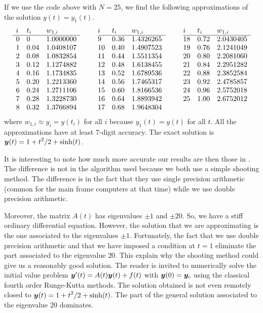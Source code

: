 \begin{egg}
If we use the code above with $N=25$, we find the following approximations of
the solution $y(t) = y_1(t)$.
\[
\begin{array}{lllc@{\hspace{2em}}lllc@{\hspace{2em}}lll}
i & t_i & w_{1,i} & & i & t_i & w_{1,i} & & i & t_i & w_{1,i} \\ 
\cline{1-3} \cline{5-7} \cline{9-11}
0 & 0 & 1.0000000 & & 9 & 0.36 & 1.4326265 & & 18 & 0.72 & 2.0430405 \\
1 & 0.04 & 1.0408107 & & 10 & 0.40 & 1.4907523 & & 19 & 0.76 & 2.1241049 \\
2 & 0.08 & 1.0832854 & & 11 & 0.44 & 1.5511354 & & 20 & 0.80 & 2.2081060 \\
3 & 0.12 & 1.1274882 & & 12 & 0.48 & 1.6138455 & & 21 & 0.84 & 2.2951282 \\
4 & 0.16 & 1.1734835 & & 13 & 0.52 & 1.6789536 & & 22 & 0.88 & 2.3852584 \\
5 & 0.20 & 1.2213360 & & 14 & 0.56 & 1.7465317 & & 23 & 0.92 & 2.4785857 \\
6 & 0.24 & 1.2711106 & & 15 & 0.60 & 1.8166536 & & 24 & 0.96 & 2.5752018 \\
7 & 0.28 & 1.3228730 & & 16 & 0.64 & 1.8893942 & & 25 & 1.00 & 2.6752012 \\
8 & 0.32 & 1.3766894 & & 17 & 0.68 & 1.9648304 & &  & &
\end{array}
\]
where $w_{1,i} \approx y_i = y(t_i)$ for all $i$ because $y_1(t) = y(t)$
for all $t$.   All the approximations have at least $7$-digit
accuracy.  The exact solution is
$\displaystyle \bm{y}(t) = 1 + t^2/2 + \sinh(t)$.

It is interesting to note how much more accurate our results are then
those in \cite{CSD}.  The difference is not in the algorithm used
because we both use a simple shooting method.  The difference is in
the fact that they use single precision arithmetic (common for the
main frame computers at that time) while we use double precision
arithmetic.

Moreover, the matrix $A(t)$ has eigenvalues $\pm 1$ and $\pm 20$.
So, we have a stiff ordinary differential equation.  However, the
solution that we are approximating is the one associated to the
eigenvalues $\pm 1$.  Fortunately, the fact that we use double
precision arithmetic and that we have imposed a condition at $t=1$
eliminate the part associated to the eigenvalue $20$.  This explain
why the shooting method could give us a reasonably good solution.
The reader is invited to numerically solve the
initial value problem $\bm{y}'(t) = A(t) \bm{y}(t) + f(t)$ with
$\bm{y}(0) = \bm{y}_c$ using the classical fourth order Runge-Kutta
methods.  The solution obtained is not even remotely closed to
$\displaystyle \bm{y}(t) = 1 + t^2/2 + \sinh(t)$.  The part of the 
general solution associated to the eigenvalue $20$ dominates.
\label{eggShootCode2}
\end{egg}

